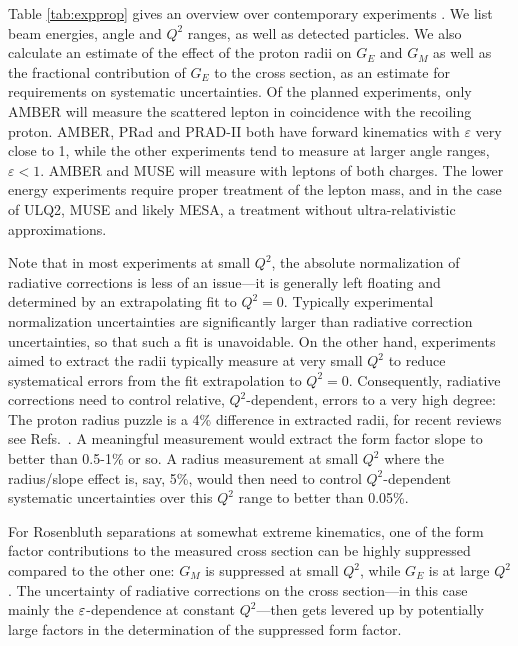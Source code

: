 Table \ref{tab:expprop} gives an overview over contemporary experiments \cite{Christy:2021snt,A1:2010nsl,A1:2013fsc,jmuellerthesis,Mihovilovic:2016rkr,Mihovilovic:2019jiz,A1:2022wzx,Xiong:2019umf,Adams:2018pwt,magixwebpage,MUSE:2017dod,Cline:2021ehf,PRad:2020oor,Suda:2022hsm}. We list beam energies, angle and $Q^2$ ranges, as well as detected particles. We also calculate an estimate of the effect of the proton radii on $G_E$ and $G_M$ as well as the fractional contribution of $G_E$ to the cross section, as an estimate for requirements on systematic uncertainties.  Of the planned experiments, only AMBER will measure the scattered lepton in coincidence with the recoiling proton. AMBER, PRad and PRAD-II both have forward kinematics with $\varepsilon$ very close to 1, while the other experiments tend to measure at larger angle ranges, $\varepsilon<1$. AMBER and MUSE will measure with leptons of both charges. The lower energy experiments require proper treatment of the lepton mass, and in the case of ULQ2, MUSE and likely MESA, a treatment without ultra-relativistic approximations.



Note that in most experiments at small $Q^2$, the absolute normalization of radiative corrections is less of an issue---it is generally left floating and determined by an extrapolating fit to $Q^2=0$. Typically experimental normalization uncertainties are significantly larger than radiative correction uncertainties, so that such a fit is unavoidable. On the other hand, experiments aimed to extract the radii typically measure at very small $Q^2$ to reduce systematical errors from the fit extrapolation to $Q^2=0$. Consequently, radiative corrections need to control relative, $Q^2$-dependent, errors to a very high degree: The proton radius puzzle is a 4\% difference in extracted radii, for recent reviews see Refs.~\cite{Antognini:2022xoo,Gao:2021sml,Peset:2021iul,Karr:2020wgh}. A meaningful measurement would extract the form factor slope to better than 0.5-1\% or so. A radius measurement at small $Q^2$ where the radius/slope effect is, say, 5\%, would then need to control $Q^2$-dependent systematic uncertainties over this $Q^2$ range to better than 0.05\%.  

For Rosenbluth separations at somewhat extreme kinematics, one of the form factor contributions to the measured cross section can be highly suppressed compared to the other one: $G_M$ is suppressed at small $Q^2$, while $G_E$ is at large $Q^2$. The uncertainty of radiative corrections on the cross section---in this case mainly the $\varepsilon$-dependence at constant $Q^2$---then gets levered up by potentially large factors in the determination of the suppressed form factor. 


